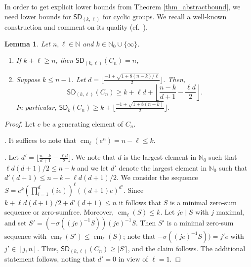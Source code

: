 \documentclass{amsart}
\newtheorem{lem}[thm]{Lemma}
\theoremstyle{definition}
\numberwithin{equation}{section}
\begin{document}
In order to get explicit lower bounds from Theorem \ref{thm_abstractbound},
we need lower bounds for ${\mathsf{SD}}_{(k,\ell)}$ for cyclic groups.
We recall a well-known construction and comment
on its quality (cf.~\cite{eric,vanvuH}).

\begin{lem}
\label{lem_standardbound}
Let $n,\ell \in \mathbb{N}$ and $k\in \mathbb{N}_0 \cup \{ \infty \}$.
\begin{enumerate}
\item If $k + \ell \ge n$, then ${\mathsf{SD}}_{(k,\ell)}(C_n)=n$,
\item Suppose $k\le n-1$.
Let $d=\bigl \lfloor \frac{-1 + \sqrt{1 + 8(n-k)/\ell}}{2}\bigr \rfloor$.
Then,
\[{\mathsf{SD}}_{(k,\ell)}(C_n)\ge k + \ell d + \left\lfloor\frac{n-k}{d+1}-\frac{\ell d}{2}\right \rfloor.\]
In particular, ${\mathsf{SD}}_k(C_n)\ge k  + \bigl \lfloor \frac{-1 + \sqrt{1 + 8(n-k)}}{2}\bigr \rfloor$.
\end{enumerate}
\end{lem}
\begin{proof}
Let $e$ be a generating element of $C_n$.

. It suffices to note that $\operatorname{cm}_{\ell}(e^n) = n - \ell \le k$.

. Let $d' =\bigl \lfloor\frac{n-k}{d+1}-\frac{\ell d}{2}\bigr \rfloor$.
We note that $d$ is the largest element in $\mathbb{N}_0$ such that $\ell d(d+1)/2 \le n-k$ and we
let $d'$ denote the largest element in $ \mathbb{N}_0$ such that $d'(d+1)\le n-k-\ell d(d+1)/2$.
We consider the sequence $S=e^{k} (\prod_{i=1}^{d}(ie))^{\ell}((d+1)e)^{d'}$.
Since $k + \ell d(d+1)/2 + d' (d+1)\le n$ it follows that $S$ is a minimal zero-sum sequence or zero-sumfree. Moreover, $\operatorname{cm}_{\ell}(S)\le k$.
Let $je\mid S$ with $j$ maximal, and set
$S' = (-\sigma((je)^{-1}S))(je)^{-1}S$. Then $S'$ is a minimal zero-sum sequence with $\operatorname{cm}_{\ell}(S')\le \operatorname{cm}_{\ell}(S)$; note that $-\sigma((je)^{-1}S)) = j'e$ with $j' \in [j,n]$.
Thus, ${\mathsf{SD}}_{(k,\ell)}(C_n)\ge |S'|$, and the claim follows.
The additional statement follows, noting that $d'=0$ in view of $\ell=1$.
\end{proof}
\end{document}
